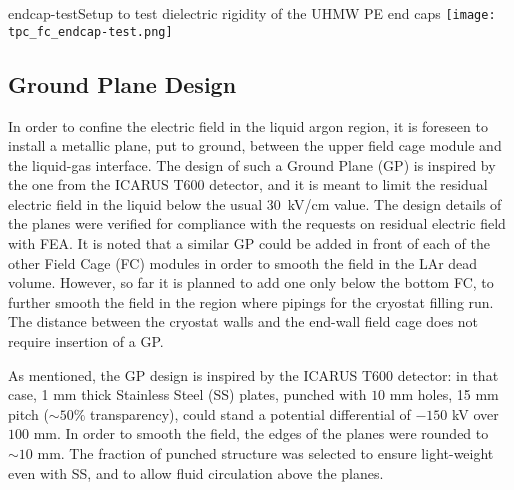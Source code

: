 \begin{cdrfigure}{endcap-test}{Setup to test dielectric rigidity of the UHMW PE end caps}
\texttt{[image: tpc\_fc\_endcap-test.png]}
\end{cdrfigure}

\subsection{Ground Plane Design}

In order to confine the electric field in the liquid argon region, it is foreseen to install a metallic plane, put to ground, 
between the upper field cage module and the liquid-gas interface. The design of such a Ground Plane (GP)  is inspired by the one from the ICARUS T600 detector, and it is meant to limit the residual electric field in the liquid below the usual 30~kV/cm value. 
The design details of the planes were verified for compliance with the requests on residual electric field with FEA.  It is noted that a similar GP could be added in front of each of the other Field Cage (FC) modules in order to smooth the field in the LAr dead volume. However, so far it is planned to add one only below the bottom FC, to further smooth the field in the region where pipings for the cryostat filling  run. The distance between the cryostat walls and the end-wall field cage does not require insertion of a GP.

As mentioned, the GP design is inspired by the ICARUS T600 detector: in that case, 1 mm thick Stainless Steel (SS) plates, punched with $10$ mm holes, 15 mm pitch ($\sim 50\%$ transparency), could stand a potential differential of $-150$ kV over $100$ mm. In order to smooth the field, the edges of the planes were rounded to $\sim 10$ mm. The fraction of punched structure was selected to ensure light-weight even with SS, and to allow fluid circulation above the planes.

